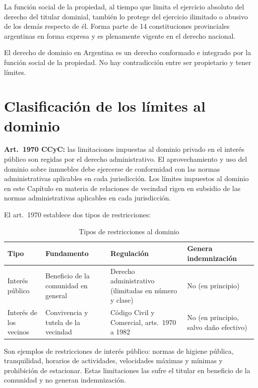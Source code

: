 \documentclass[12pt,oneside]{book}
\begin{document}
La función social de la propiedad, al tiempo que limita el ejercicio absoluto del derecho del titular dominial, también lo protege del ejercicio ilimitado o abusivo de los demás respecto de él. Forma parte de 14 constituciones provinciales argentinas en forma expresa y es plenamente vigente en el derecho nacional.

\begin{important}
El derecho de dominio en Argentina es un derecho conformado e integrado por la función social de la propiedad. No hay contradicción entre ser propietario y tener límites.
\end{important}

\section{Clasificación de los límites al dominio}

\textbf{Art.~1970 CCyC:} las limitaciones impuestas al dominio privado en el interés público son regidas por el derecho administrativo. El aprovechamiento y uso del dominio sobre inmuebles debe ejercerse de conformidad con las normas administrativas aplicables en cada jurisdicción. Los límites impuestos al dominio en este Capítulo en materia de relaciones de vecindad rigen en subsidio de las normas administrativas aplicables en cada jurisdicción.

El art.~1970 establece dos tipos de restricciones:

\begin{table}[H]
\centering
\caption{Tipos de restricciones al dominio}
\small
\begin{tabularx}{\textwidth}{
    >{\raggedright\arraybackslash}p{}
    >{\raggedright\arraybackslash}p{}
    >{\raggedright\arraybackslash}X
    >{\raggedright\arraybackslash}p{}
}
\toprule
\textbf{Tipo} & \textbf{Fundamento} & \textbf{Regulación} & \textbf{Genera indemnización} \\
\midrule
Interés público & Beneficio de la comunidad en general & Derecho administrativo (ilimitadas en número y clase) & No (en principio) \\
Interés de los vecinos & Convivencia y tutela de la vecindad & Código Civil y Comercial, arts.~1970 a 1982 & No (en principio, salvo daño efectivo) \\
\bottomrule
\end{tabularx}
\end{table}

Son ejemplos de restricciones de interés público: normas de higiene pública, tranquilidad, horarios de actividades, velocidades máximas y mínimas y prohibición de estacionar. Estas limitaciones las sufre el titular en beneficio de la comunidad y no generan indemnización.
\end{document}
